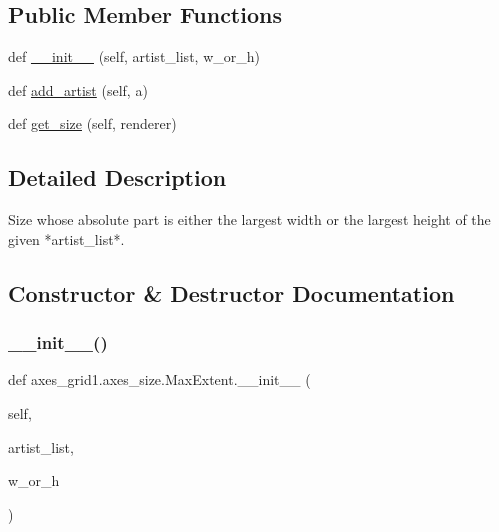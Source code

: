 \subsection*{Public Member Functions}
\begin{DoxyCompactItemize}
\item 
def \hyperlink{classaxes__grid1_1_1axes__size_1_1MaxExtent_a9a3869ce533c7c61cdcb4dba2658c40b}{\+\_\+\+\_\+init\+\_\+\+\_\+} (self, artist\+\_\+list, w\+\_\+or\+\_\+h)
\item 
def \hyperlink{classaxes__grid1_1_1axes__size_1_1MaxExtent_ad5f271005ee4f0de5ed14724ac020ae0}{add\+\_\+artist} (self, a)
\item 
def \hyperlink{classaxes__grid1_1_1axes__size_1_1MaxExtent_a1e9833f2eeede046fb6e25e2bf29c0e0}{get\+\_\+size} (self, renderer)
\end{DoxyCompactItemize}


\subsection{Detailed Description}
\begin{DoxyVerb}Size whose absolute part is either the largest width or the largest height
of the given *artist_list*.
\end{DoxyVerb}
 

\subsection{Constructor \& Destructor Documentation}
\mbox{\label{classaxes__grid1_1_1axes__size_1_1MaxExtent_a9a3869ce533c7c61cdcb4dba2658c40b}} 
\subsubsection{\texorpdfstring{\+\_\+\+\_\+init\+\_\+\+\_\+()}{\_\_init\_\_()}}
{\footnotesize\ttfamily def axes\+\_\+grid1.\+axes\+\_\+size.\+Max\+Extent.\+\_\+\+\_\+init\+\_\+\+\_\+ (\begin{DoxyParamCaption}\item[{}]{self,  }\item[{}]{artist\+\_\+list,  }\item[{}]{w\+\_\+or\+\_\+h }\end{DoxyParamCaption})}




